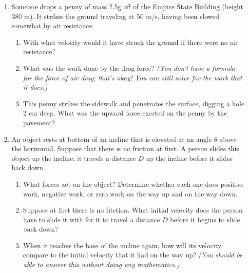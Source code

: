 \documentclass[12pt]{article}
\begin{document}
\newpage

\begin{enumerate}

\item{Someone drops a penny of mass 2.5g off of the Empire State Building (height 380 m). It strikes the ground traveling at 50 m/s, having been slowed somewhat by air resistance.}
\begin{enumerate}
	\item{With what velocity would it have struck the ground if there were no air resistance?}
	\vspace{2.5in}
	\item{What was the work done by the drag force? {\it (You don't have a formula for the force of air drag; that's okay! You can still solve for the work that it does.)}}
	\vspace{2.5in}
	\item{This penny strikes the sidewalk and penetrates the surface, digging a hole 2 cm deep. What was the upward force exerted on the penny by the pavement?}
	\vspace{2in}
\end{enumerate}

\newpage


\item{An object rests at bottom of an incline that is elevated at an angle $\theta$ above the horizontal. Suppose that there is no friction at first. A person slides this object up the incline; it travels a distance $D$ up the incline before it slides back down.}
	
	\begin{enumerate}
		
		\item What forces act on the object? Determine whether each one does positive work, negative work, or zero work on the way up and on the way down.

\vspace{2in}

\item	Suppose at first there is no friction. What initial velocity does the person have to slide it with for it to travel a distance $D$ before it begins to slide back down? 
	
	\vspace{2.5in}
	
\item	When it reaches the base of the incline again, how will its velocity compare to the initial velocity that it had on the way up? {\it (You should be able to answer this without doing any mathematics.)}
	

\end{enumerate}
\end{enumerate}
\end{document}
